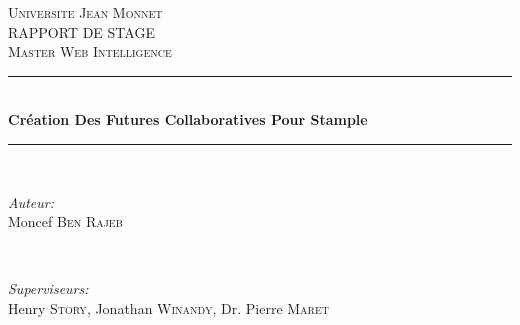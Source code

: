 \documentclass[12pt]{article}
\begin{document}
\begin{titlepage}

\newcommand{\HRule}{\rule{\linewidth}{0.5mm}} %

\center %
 

\textsc{\LARGE Universite Jean Monnet}\\[1.5cm] %
\textsc{\Large RAPPORT DE STAGE}\\[0.5cm] %
\textsc{\large Master Web Intelligence}\\[0.5cm] %


\HRule \\[1.2cm]
{ \huge \bfseries Cr\'eation Des Futures Collaboratives Pour Stample}\\[1.6cm] %
\HRule \\[3cm]
 

\begin{minipage}{0.4\textwidth}
\begin{flushleft} \large
\emph{Auteur:}\\
Moncef \textsc{Ben Rajeb} %
\end{flushleft}
\end{minipage}
~
\begin{minipage}{0.4\textwidth}
\begin{flushleft} \large
\emph{Superviseurs:} \\
Henry \textsc{Story}, %
Jonathan \textsc{Winandy}, Dr. Pierre \textsc{Maret} %

\end{flushleft}
\end{minipage}\\[4cm]


\end{titlepage}
\end{document}
